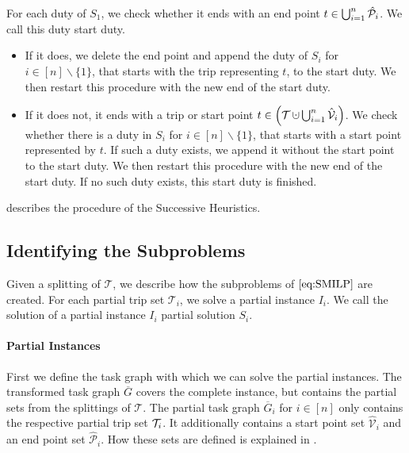 For each duty of $S_1$, we check whether it ends with an end point $t\in\bigcup_{i=1}^n\hat{\mathcal{P}}_i$. We call this duty start duty.
\begin{itemize}
	\item{If it does, we delete the end point and append the duty of $S_i$ for ${i\in[n]\backslash\{1\}}$, that starts with the trip representing $t$, to the start duty. We then restart this procedure with the new end of the start duty.}
	\item{If it does not, it ends with a trip or start point ${t\in\left(\mathcal{T}\cupdot\bigcup_{i=1}^n\Vhat_i\right)}$. We check whether there is a duty in $S_i$ for ${i\in[n]\backslash\{1\}}$, that starts with a start point represented by $t$. If such a duty exists, we append it without the start point to the start duty. We then restart this procedure with the new end of the start duty. If no such duty exists, this start duty is finished}.
\end{itemize}

 describes the procedure of the Successive Heuristics.


\subsection{Identifying the Subproblems}

Given a splitting of $\mathcal{T}$, we describe how the subproblems of $\eqref{eq:SMILP}$ are created. For each partial trip set $\mathcal{T}_i$, we solve a partial instance $I_i$. We call the solution of a partial instance $I_i$ partial solution $S_i$. 

\paragraph{Partial Instances} \parfill

First we define the task graph with which we can solve the partial instances. The transformed task graph $\overline{G}$ covers the complete instance, but contains the partial sets from the splittings of $\mathcal{T}$. The partial task graph $\overline{G}_i$ for $i\in[n]$ only contains the respective partial trip set $\mathcal{T}_i$. It additionally contains a start point set $\hat{\mathcal{V}}_i$ and an end point set $\hat{\mathcal{P}}_i$. How these sets are defined is explained in .

